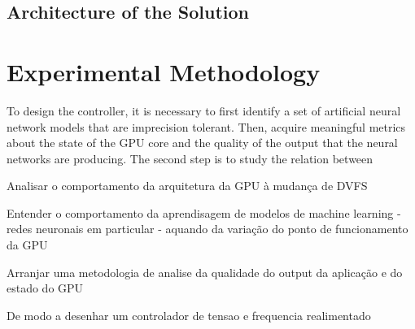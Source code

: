 \subsection{Architecture of the Solution}
\label{section:solarch}

\section{Experimental Methodology}

To design the controller, it is necessary to first identify a set of artificial neural network models that are imprecision tolerant. Then, acquire meaningful metrics about the state of the GPU core and the quality of the output that the neural networks are producing. The second step is to study the relation between 

Analisar o comportamento da arquitetura da GPU à mudança de DVFS

Entender o comportamento da aprendisagem de modelos de machine learning - redes neuronais em particular - aquando da variação do ponto de funcionamento da GPU

Arranjar uma metodologia de analise da qualidade do output da aplicação e do estado do GPU

De modo a desenhar um controlador de tensao e frequencia realimentado 